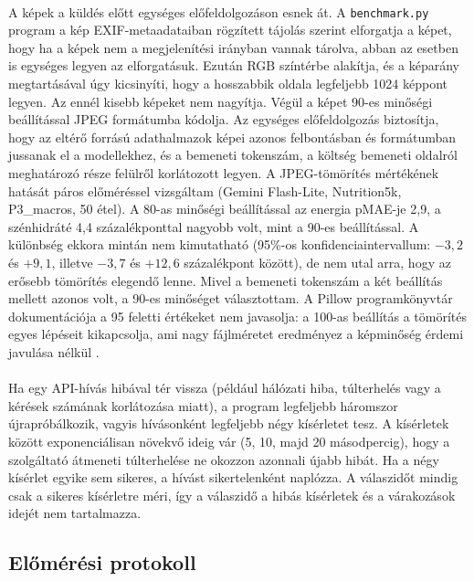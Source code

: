 \paragraph{}A képek a küldés előtt egységes előfeldolgozáson esnek át. A \texttt{benchmark.py} program a kép EXIF-metaadataiban rögzített tájolás szerint elforgatja a képet, 
hogy ha a képek nem a megjelenítési irányban vannak tárolva, abban az esetben is egységes legyen az elforgatásuk. Ezután RGB színtérbe alakítja, és a képarány megtartásával úgy 
kicsinyíti, hogy a hosszabbik oldala legfeljebb 1024 képpont legyen. Az ennél kisebb képeket nem nagyítja. Végül a képet 90-es minőségi beállítással JPEG formátumba kódolja. 
Az egységes előfeldolgozás biztosítja, hogy az eltérő forrású adathalmazok képei azonos felbontásban és formátumban jussanak el a modellekhez, és a bemeneti tokenszám, 
a költség bemeneti oldalról meghatározó része felülről korlátozott legyen.
A JPEG-tömörítés mértékének hatását páros előméréssel vizsgáltam (Gemini Flash-Lite, Nutrition5k, P3\_macros, 50 étel). A 80-as minőségi beállítással az energia pMAE-je 2,9, a 
szénhidráté 4,4 százalékponttal nagyobb volt, mint a 90-es beállítással. A különbség ekkora mintán nem kimutatható (95\%-os konfidenciaintervallum: $-3{,}2$ és $+9{,}1$, 
illetve $-3{,}7$ és $+12{,}6$ százalékpont között), de nem utal arra, hogy az erősebb tömörítés elegendő lenne. Mivel a bemeneti tokenszám a két beállítás mellett azonos volt,
a 90-es minőséget választottam.
A Pillow programkönyvtár dokumentációja a 95 feletti értékeket nem javasolja: a 100-as beállítás a tömörítés egyes lépéseit kikapcsolja, ami nagy fájlméretet eredményez 
a képminőség érdemi javulása nélkül \cite{pillow_jpeg}.

\paragraph{}Ha egy API-hívás hibával tér vissza (például hálózati hiba, túlterhelés vagy a kérések számának korlátozása miatt), a program legfeljebb háromszor újrapróbálkozik, 
vagyis hívásonként legfeljebb négy kísérletet tesz. A kísérletek között exponenciálisan növekvő ideig vár (5, 10, majd 20 másodpercig), hogy a szolgáltató átmeneti túlterhelése 
ne okozzon azonnali újabb hibát. Ha a négy kísérlet egyike sem sikeres, a hívást sikertelenként naplózza. A válaszidőt mindig csak a sikeres kísérletre méri, így a válaszidő a 
hibás kísérletek és a várakozások idejét nem tartalmazza.

\subsection{Előmérési protokoll}
